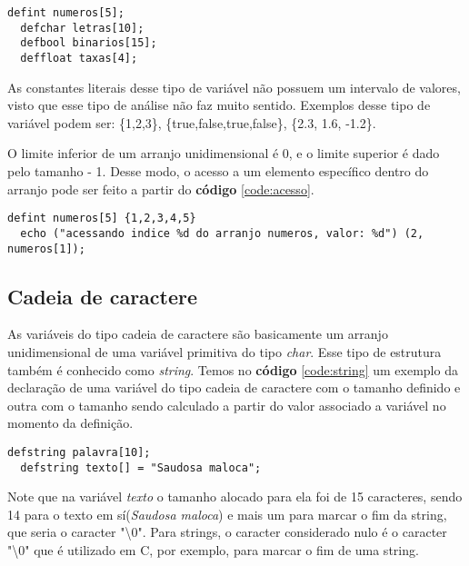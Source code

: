 \documentclass[
  12pt,				%
  oneside,			%
  a4paper,			%
  english,			%
  french,				%
  spanish,			%
  brazil,				%
]{abntex2}
\begin{document}
\begin{lstlisting}[label=code:arranjos-unidimensionais,caption=Declaração
    de uma variável do tipo arranjo unidimensional.]
  defint numeros[5];
  defchar letras[10];
  defbool binarios[15];
  deffloat taxas[4];
\end{lstlisting}

As constantes literais desse tipo de variável não possuem um intervalo
de valores, visto que esse tipo de análise não faz muito
sentido. Exemplos desse tipo de variável podem ser: \{1,2,3\},
\{true,false,true,false\}, \{2.3, 1.6, -1.2\}.

O limite inferior de um arranjo unidimensional é 0, e o limite
superior é dado pelo tamanho - 1. Desse modo, o acesso a um elemento
específico dentro do arranjo pode ser feito a partir do
\textbf{código} \ref{code:acesso}.

\begin{lstlisting}[label=code:acesso,caption=Acessando elemento dentro
    de um arranjo unidimensional]
  defint numeros[5] {1,2,3,4,5}
  echo ("acessando indice %d do arranjo numeros, valor: %d") (2, numeros[1]);
\end{lstlisting}


\subsection{Cadeia de caractere}
\label{subsec:cadeia-de-caractere}

As variáveis do tipo cadeia de caractere são basicamente um arranjo
unidimensional de uma variável primitiva do tipo \emph{char}. Esse
tipo de estrutura também é conhecido como \emph{string}. Temos no
\textbf{código} \ref{code:string} um exemplo da declaração de uma
variável do tipo cadeia de caractere com o tamanho definido e outra
com o tamanho sendo calculado a partir do valor associado a variável
no momento da definição.

\begin{lstlisting}[label=code:string,caption=Declaração de variáveis
    do tipo cadeia de caractere.]
  defstring palavra[10];
  defstring texto[] = "Saudosa maloca";
\end{lstlisting}

Note que na variável \emph{texto} o tamanho alocado para ela foi de
15 caracteres, sendo 14 para o texto em sí(\emph{Saudosa maloca}) e
mais um para marcar o fim da string, que seria o caracter "\textbackslash0". Para
strings, o caracter considerado nulo é o caracter "\textbackslash0"
que é utilizado em C, por exemplo, para marcar o fim de uma string.
\end{document}
